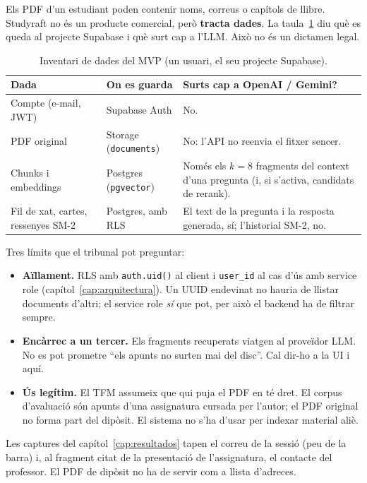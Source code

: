Els PDF d'un estudiant poden contenir noms, correus o capítols de llibre. Studyraft no és un producte comercial, però \textbf{tracta dades}. La taula~\ref{tab:dades} diu què es queda al projecte Supabase i què surt cap a l'LLM. Això no és un dictamen legal.

\begin{table}[htbp]
\centering
\caption{Inventari de dades del MVP (un usuari, el seu projecte Supabase).}
\label{tab:dades}
\small
\begin{tabularx}{\textwidth}{>{\raggedright\arraybackslash}p{3.2cm}>{\raggedright\arraybackslash}p{3.4cm}X}
\toprule
Dada & On es guarda & Surts cap a OpenAI / Gemini? \\
\midrule
Compte (e-mail, JWT)
  & Supabase Auth
  & No. \\
PDF original
  & Storage (\texttt{documents})
  & No: l'API no reenvia el fitxer sencer. \\
Chunks i embeddings
  & Postgres (\texttt{pgvector})
  & Només els $k{=}8$ fragments del context d'una pregunta (i, si s'activa, candidats de rerank). \\
Fil de xat, cartes, ressenyes SM-2
  & Postgres, amb RLS
  & El text de la pregunta i la resposta generada, sí; l'historial SM-2, no. \\
\bottomrule
\end{tabularx}
\end{table}

Tres límits que el tribunal pot preguntar:

\begin{itemize}
  \item \textbf{Aïllament.} RLS amb \texttt{auth.uid()} al client i \texttt{user\_id} al cas d'ús amb service role (capítol~\ref{cap:arquitectura}). Un UUID endevinat no hauria de llistar documents d'altri; el service role \emph{sí} que pot, per això el backend ha de filtrar sempre.
  \item \textbf{Encàrrec a un tercer.} Els fragments recuperats viatgen al proveïdor LLM. No es pot prometre ``els apunts no surten mai del disc''. Cal dir-ho a la UI i aquí.
  \item \textbf{Ús legítim.} El TFM assumeix que qui puja el PDF en té dret. El corpus d'avaluació són apunts d'una assignatura cursada per l'autor; el PDF original no forma part del dipòsit. El sistema no s'ha d'usar per indexar material aliè.
\end{itemize}

Les captures del capítol~\ref{cap:resultados} tapen el correu de la sessió (peu de la barra) i, al fragment citat de la presentació de l'assignatura, el contacte del professor. El PDF de dipòsit no ha de servir com a llista d'adreces.

